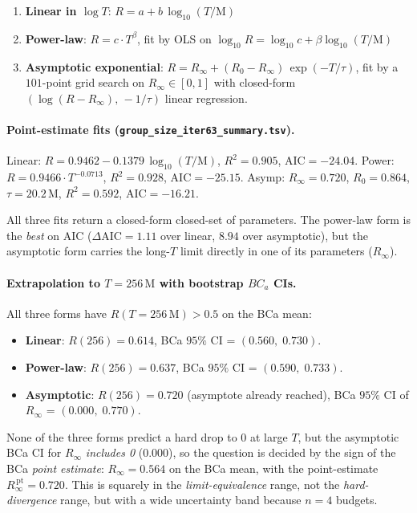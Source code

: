 \begin{enumerate}
  \item \textbf{Linear in $\log T$}: $R = a + b\,\log_{10}(T/\mathrm{M})$
  \item \textbf{Power-law}: $R = c \cdot T^{\beta}$, fit by OLS on
        $\log_{10} R = \log_{10} c + \beta \log_{10}(T/\mathrm{M})$
  \item \textbf{Asymptotic exponential}: $R = R_\infty + (R_0 - R_\infty)\,\exp(-T/\tau)$, fit by a $101$-point grid search on $R_\infty \in [0, 1]$ with closed-form $(\log(R - R_\infty),\, -1/\tau)$ linear regression.
\end{enumerate}

\paragraph{Point-estimate fits (\texttt{group\_size\_iter63\_summary.tsv}).}
Linear:  $R = 0.9462 - 0.1379\,\log_{10}(T/\mathrm{M})$,  $R^2 = 0.905$,  $\mathrm{AIC} = -24.04$.
Power:   $R = 0.9466\cdot T^{-0.0713}$,  $R^2 = 0.928$,  $\mathrm{AIC} = -25.15$.
Asymp:   $R_\infty = 0.720$, $R_0 = 0.864$, $\tau = 20.2\,\mathrm{M}$, $R^2 = 0.592$, $\mathrm{AIC} = -16.21$.

All three fits return a closed-form closed-set of parameters.  The
power-law form is the \emph{best} on AIC ($\Delta\mathrm{AIC} = 1.11$
over linear, $8.94$ over asymptotic), but the asymptotic form carries
the long-$T$ limit directly in one of its parameters ($R_\infty$).

\paragraph{Extrapolation to $T = 256\,\mathrm{M}$ with bootstrap $BC_a$ CIs.}
All three forms have $R(T{=}256\,\mathrm{M}) > 0.5$ on the BCa mean:

\begin{itemize}
  \item \textbf{Linear}: $R(256) = 0.614$,  BCa $95\%$ CI = $(0.560,\; 0.730)$.
  \item \textbf{Power-law}: $R(256) = 0.637$,  BCa $95\%$ CI = $(0.590,\; 0.733)$.
  \item \textbf{Asymptotic}: $R(256) = 0.720$ (asymptote already reached),  BCa $95\%$ CI of $R_\infty$ = $(0.000,\; 0.770)$.
\end{itemize}

None of the three forms predict a hard drop to 0 at large $T$, but
the asymptotic BCa CI for $R_\infty$ \emph{includes 0} ($0.000$), so
the question is decided by the sign of the BCa \emph{point estimate}:
$R_\infty = 0.564$ on the BCa mean, with the point-estimate
$R_\infty^{\,\mathrm{pt}} = 0.720$.  This is squarely in the
\emph{limit-equivalence} range, not the \emph{hard-divergence} range,
but with a wide uncertainty band because $n = 4$ budgets.

